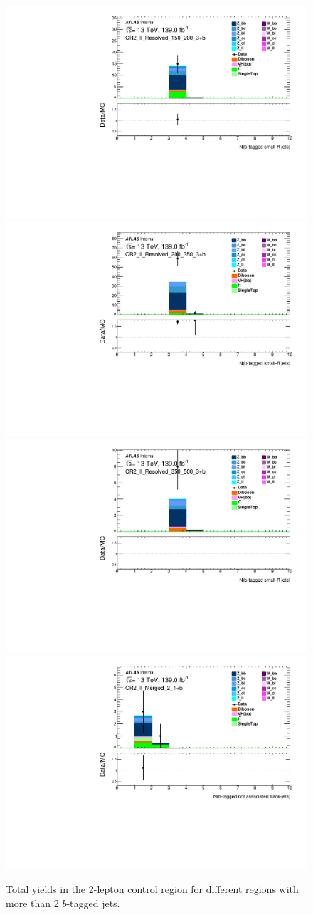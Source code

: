 \begin{figure}[!htb]
    \includegraphics[width=0.46\linewidth]{chapters/c8/figures/2L/DataMC_MonoH_Nominal_CR2_ll_Resolved_150_200_3+b_N_BJets_04.pdf}
    \includegraphics[width=0.46\linewidth]{chapters/c8/figures/2L/DataMC_MonoH_Nominal_CR2_ll_Resolved_200_350_3+b_N_BJets_04.pdf}\\
    \includegraphics[width=0.46\linewidth]{chapters/c8/figures/2L/DataMC_MonoH_Nominal_CR2_ll_Resolved_350_500_3+b_N_BJets_04.pdf}
    \includegraphics[width=0.46\linewidth]{chapters/c8/figures/2L/DataMC_MonoH_Nominal_CR2_ll_Merged_2_1+b_N_BTags_not_associated_02.pdf}
    \caption{Total yields in the 2-lepton control region for different \met regions with more than 2 $b$-tagged jets.}
    \label{fig:data-mc-2l-ll-nb-3+b}
\end{figure}
